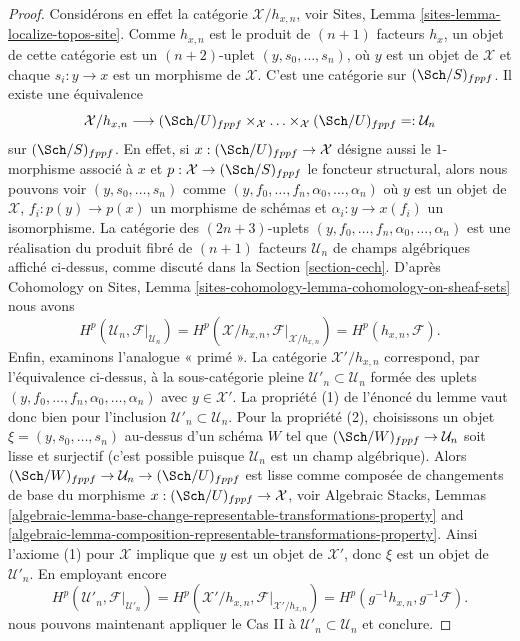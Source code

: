 \begin{proof}
\medskip\noindent
Considérons en effet la catégorie $\mathcal{X}/h_{x, n}$, voir
Sites, Lemma \ref{sites-lemma-localize-topos-site}.
Comme $h_{x, n}$ est le produit de $(n + 1)$ facteurs $h_x$, un
objet de cette catégorie est un $(n + 2)$-uplet
$(y, s_0, \ldots, s_n)$, où $y$ est un objet de $\mathcal{X}$ et chaque
$s_i : y \to x$ est un morphisme de $\mathcal{X}$.
C'est une catégorie sur $(\Sch/S)_{fppf}$. Il existe une équivalence
$$
\mathcal{X}/h_{x, n}
\longrightarrow
(\Sch/U)_{fppf} \times_\mathcal{X} \ldots \times_\mathcal{X} (\Sch/U)_{fppf}
=: \mathcal{U}_n
$$
sur $(\Sch/S)_{fppf}$. En effet, si $x : (\Sch/U)_{fppf} \to \mathcal{X}$ désigne aussi
le $1$-morphisme associé à $x$ et
$p : \mathcal{X} \to (\Sch/S)_{fppf}$ le foncteur structural,
alors nous pouvons voir $(y, s_0, \ldots, s_n)$ comme
$(y, f_0, \ldots, f_n, \alpha_0, \ldots, \alpha_n)$
où $y$ est un objet de $\mathcal{X}$, $f_i : p(y) \to p(x)$ un
morphisme de schémas et $\alpha_i : y \to x(f_i)$ un isomorphisme.
La catégorie des $(2n+3)$-uplets
$(y, f_0, \ldots, f_n, \alpha_0, \ldots, \alpha_n)$
est une réalisation du produit fibré de $(n + 1)$ facteurs $\mathcal{U}_n$
de champs algébriques affiché ci-dessus, comme discuté dans la
Section \ref{section-cech}.
D'après Cohomology on Sites, Lemma
\ref{sites-cohomology-lemma-cohomology-on-sheaf-sets}
nous avons
$$
H^p(\mathcal{U}_n, \mathcal{F}|_{\mathcal{U}_n}) =
H^p(\mathcal{X}/h_{x, n}, \mathcal{F}|_{\mathcal{X}/h_{x, n}}) =
H^p(h_{x, n}, \mathcal{F}).
$$
Enfin, examinons l'analogue « primé ». La catégorie
$\mathcal{X}'/h_{x, n}$ correspond, par l'équivalence ci-dessus,
à la sous-catégorie pleine $\mathcal{U}'_n \subset \mathcal{U}_n$
formée des uplets
$(y, f_0, \ldots, f_n, \alpha_0, \ldots, \alpha_n)$
avec $y \in \mathcal{X}'$. La propriété (1) de l'énoncé du
lemme vaut donc bien
pour l'inclusion $\mathcal{U}'_n \subset \mathcal{U}_n$.
Pour la propriété (2), choisissons un objet $\xi = (y, s_0, \ldots, s_n)$
au-dessus d'un schéma $W$ tel que $(\Sch/W)_{fppf} \to \mathcal{U}_n$
soit lisse et surjectif (c'est possible puisque $\mathcal{U}_n$ est
un champ algébrique). Alors
$(\Sch/W)_{fppf} \to \mathcal{U}_n \to (\Sch/U)_{fppf}$
est lisse comme composée de changements de base du morphisme
$x : (\Sch/U)_{fppf} \to \mathcal{X}$, voir
Algebraic Stacks, Lemmas
\ref{algebraic-lemma-base-change-representable-transformations-property} and
\ref{algebraic-lemma-composition-representable-transformations-property}.
Ainsi l'axiome (1) pour $\mathcal{X}$ implique que $y$ est un objet de
$\mathcal{X}'$, donc $\xi$ est un objet de $\mathcal{U}'_n$.
En employant encore
$$
H^p(\mathcal{U}'_n, \mathcal{F}|_{\mathcal{U}'_n}) =
H^p(\mathcal{X}'/h_{x, n}, \mathcal{F}|_{\mathcal{X}'/h_{x, n}}) =
H^p(g^{-1}h_{x, n}, g^{-1}\mathcal{F}).
$$
nous pouvons maintenant appliquer le Cas II à
$\mathcal{U}'_n \subset \mathcal{U}_n$
et conclure.
\end{proof}








